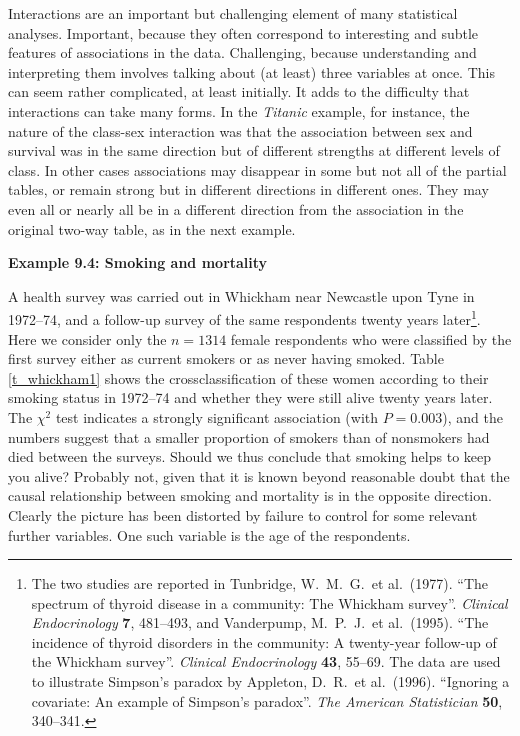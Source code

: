 Interactions are an important but challenging element of many
statistical analyses. Important, because they often correspond to
interesting and subtle features of associations in the data.
Challenging, because understanding and interpreting them involves
talking about (at least) three variables at once. This can seem rather
complicated, at least initially. It adds to the difficulty that
interactions can take many forms. In the \emph{Titanic} example, for
instance, the nature of the class-sex interaction was that the
association between sex and survival was in the same direction but of
different strengths at different levels of class. In other cases
associations may disappear in some but not all of the partial tables, or
remain strong but in different directions in different ones. They may
even all or nearly all be in a different direction from the association
in the original two-way table, as in the next example.



\textbf{Example 9.4: Smoking and mortality}

A health survey was carried out in Whickham near Newcastle upon Tyne in
1972--74, and a follow-up survey of the same respondents twenty years
later\footnote{The two studies are reported in Tunbridge, W.\ M.\ G.\ et
al.\ (1977). ``The spectrum of thyroid disease in a community: The
Whickham survey''.
\emph{Clinical Endocrinology} \textbf{7}, 481--493,
and Vanderpump, M.\ P.\ J.\ et al.\ (1995). ``The incidence of thyroid
disorders in the community: A twenty-year follow-up of the Whickham
survey''.
\emph{Clinical Endocrinology} \textbf{43}, 55--69.
The data are used to illustrate Simpson's paradox by Appleton, D.\ R.\
et al.\ (1996). ``Ignoring a covariate: An example of Simpson's
paradox''. \emph{The American Statistician} \textbf{50}, 340--341.
}. Here we consider only the $n=1314$ female respondents who were
classified by the first survey either as current smokers or as never
having smoked. Table \ref{t_whickham1} shows the crossclassification of
these women according to their smoking status in 1972--74 and whether
they were still alive twenty years later. The $\chi^{2}$ test indicates
a strongly significant association (with $P=0.003$), and the numbers
suggest that a smaller proportion of smokers than of nonsmokers had died
between the surveys. Should we thus conclude that smoking helps to keep
you alive? Probably not, given that it is known beyond reasonable
doubt that the causal relationship between smoking and mortality
is in the opposite direction. Clearly the picture has been distorted by
failure to control for some relevant further variables. One such
variable is the age of the respondents.

